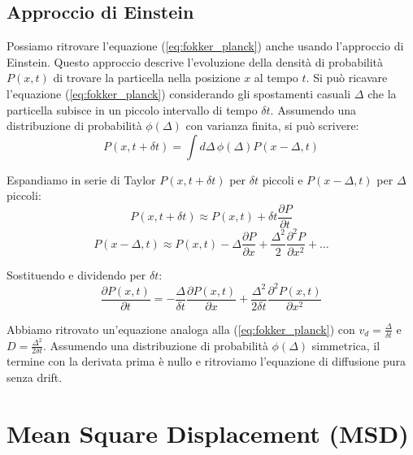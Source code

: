 \subsection{Approccio di Einstein}
Possiamo ritrovare l'equazione (\ref{eq:fokker_planck}) anche usando l'approccio di Einstein. Questo approccio descrive l'evoluzione della densità di probabilità $P(x,t)$ di trovare la particella nella posizione $x$ al tempo $t$.
Si può ricavare l'equazione (\ref{eq:fokker_planck}) considerando gli spostamenti casuali $\Delta$ che la particella subisce in un piccolo intervallo di tempo $\delta t$. Assumendo una distribuzione di probabilità $\phi(\Delta)$ con varianza finita, si può scrivere:
\begin{equation}
P(x, t+\delta t) = \int d\Delta \, \phi(\Delta) P(x-\Delta, t)
\end{equation}

Espandiamo in serie di Taylor $P(x, t+\delta t)$ per $\delta t$ piccoli e $P(x-\Delta, t)$ per $\Delta$ piccoli:
\begin{equation}
P(x, t+\delta t) \approx P(x,t) + \delta t \frac{\partial P}{\partial t}
\end{equation}
\begin{equation}
P(x-\Delta,  t) \approx P(x,t) - \Delta  \frac{\partial P}{\partial x} + \frac{\Delta^2 }{2} \frac{\partial^2 P}{\partial x^2} + \dots
\end{equation}

Sostituendo e dividendo per $\delta t$:
\begin{equation}
\frac{\partial P(x,t)}{\partial t} = - \frac{ \Delta }{\delta t} \frac{\partial P(x,t)}{\partial x} + \frac{ \Delta^2 }{2 \delta t} \frac{\partial^2 P(x,t)}{\partial x^2}
\end{equation}

Abbiamo ritrovato un'equazione analoga alla (\ref{eq:fokker_planck}) con $v_d = \frac{ \Delta }{\delta t}$ e $D = \frac{ \Delta^2 }{2 \delta t}$.
Assumendo una distribuzione di probabilità $\phi(\Delta)$ simmetrica, il termine con la derivata prima è nullo e ritroviamo l'equazione di diffusione pura senza drift.

\section{Mean Square Displacement (MSD)}

